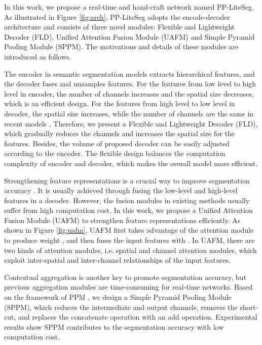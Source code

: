 \documentclass[10pt,twocolumn,letterpaper]{article}
\begin{document}
In this work, we propose a real-time and hand-craft network named PP-LiteSeg. As illustrated in Figure \ref{fig:arch}, PP-LiteSeg adopts the encode-decoder architecture and consists of three novel modules: Flexible and Lightweight Decoder (FLD), Unified Attention Fusion Module (UAFM) and Simple Pyramid Pooling Module (SPPM). The motivations and details of these modules are introduced as follows.

The encoder in semantic segmentation models extracts hierarchical features, and the decoder fuses and unsamples features.
For the features from low level to high level in encoder, the number of channels increases and the spatial size decreases, which is an efficient design.
For the features from high level to low level in decoder, the spatial size increases, while the number of channels are the same in recent models \cite{li2020semantic, fan2021rethinking}.
Therefore, we present a Flexible and Lightweight Decoder (FLD), which gradually reduces the channels and increases the spatial size for the features.
Besides, the volume of proposed decoder can be easily adjusted according to the encoder. The flexible design balances the computation complexity of encoder and decoder, which makes the overall model more efficient.




Strengthening feature representations is a crucial way to improve segmentation accuracy \cite{li2020semantic, huang2021fapn, song2021attanet}.
It is usually achieved through fusing the low-level and high-level features in a decoder. However, the fusion modules in existing methods usually suffer from high computation cost.
In this work, we propose a Unified Attention Fusion Module (UAFM) to strengthen feature representations efficiently. As shown in Figure \ref{fig:uafm}, UAFM first takes advantage of the attention module to produce weight , and then fuses the input features with .
In UAFM, there are two kinds of attention modules, i.e. spatial and channel attention modules, which exploit inter-spatial and inter-channel relationships of the input features.



Contextual aggregation is another key to promote segmentation accuracy, but previous aggregation modules are time-consuming for real-time networks.
Based on the framework of PPM \cite{zhao2017pyramid}, we design a Simple Pyramid Pooling Module (SPPM), which reduces the intermediate and output channels, removes the short-cut, and replaces the concatenate operation with an add operation. Experimental results show SPPM contributes to the segmentation accuracy with low computation cost.
\end{document}
